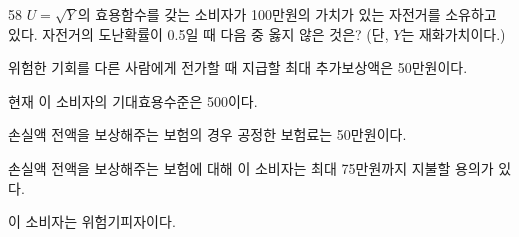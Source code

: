 \begin{question}{58}
$U= \sqrt { Y }$의 효용함수를 갖는 소비자가 100만원의 가치가 있는 자전거를 소유하고 있다. 자전거의 도난확률이 0.5일 때 다음 중 옳지 않은 것은? (단, $Y$는 재화가치이다.)
\begin{choices}
  \item 위험한 기회를 다른 사람에게 전가할 때 지급할 최대 추가보상액은 50만원이다.
  \item 현재 이 소비자의 기대효용수준은 500이다.
  \item 손실액 전액을 보상해주는 보험의 경우 공정한 보험료는 50만원이다.
  \item 손실액 전액을 보상해주는 보험에 대해 이 소비자는 최대 75만원까지 지불할 용의가 있다.
  \item 이 소비자는 위험기피자이다.
\end{choices}
\end{question}
